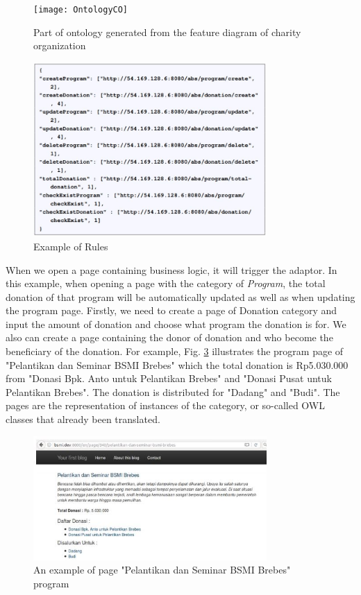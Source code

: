 \documentclass[conference]{IEEEtran}
\begin{document}
\begin{figure}[!t]
\centering
\texttt{[image: OntologyCO]}

\caption{Part of ontology generated from the feature diagram of charity organization}
\label{fig_ontaisco}
\end{figure}

\begin{figure}[!t]
\centering
\includegraphics[width=3.5in]{Rules}

\caption{Example of Rules}
\label{fig_rules}
\end{figure}

When we open a page containing business logic, it will trigger the adaptor. In this example, when opening a page with the category of \textit{Program}, the total donation of that program will be automatically updated as well as when updating the program page. Firstly, we need to create a page of Donation category and input the amount of donation and choose what program the donation is for. We also can create a page containing the donor of donation and who become the beneficiary of the donation. For example, Fig. \ref{view_program} illustrates the program page of "Pelantikan dan Seminar BSMI Brebes" which the total donation is Rp5.030.000 from "Donasi Bpk. Anto untuk Pelantikan Brebes" and "Donasi Pusat untuk Pelantikan Brebes". The donation is distributed for "Dadang" and "Budi". The pages are the representation of instances of the category, or so-called OWL classes that already been translated. 

\begin{figure}[h]
	\centering
	\includegraphics[width=3.5in]{samplepage}
	
	\caption{An example of page "Pelantikan dan Seminar BSMI Brebes" program}
	\label{view_program}
\end{figure}
\end{document}
